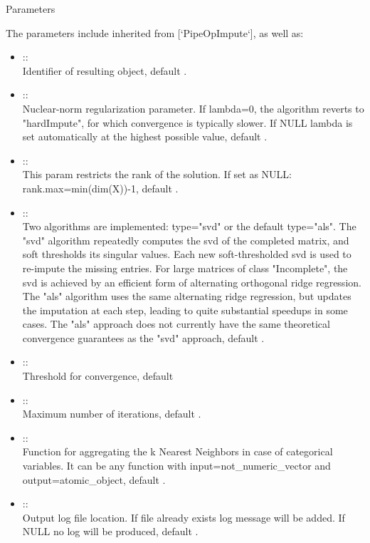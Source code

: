 \documentclass[letterpaper]{book}
\begin{document}
\begin{Section}{Parameters}

The parameters include inherited from [`PipeOpImpute`], as well as: \\{}
\begin{itemize}

\item{}  :: \\{}
Identifier of resulting object, default .
\item{}  :: \\{}
Nuclear-norm regularization parameter. If lambda=0, the algorithm reverts to "hardImpute", for which convergence is typically slower. If NULL lambda is set automatically at the highest possible value, default .
\item{}  :: \\{}
This param restricts the rank of the solution. If set as NULL: rank.max=min(dim(X))-1, default .
\item{}  :: \\{}
Two algorithms are implemented: type="svd" or the default type="als". The "svd" algorithm repeatedly computes the svd of the completed matrix, and soft thresholds its singular values. Each new soft-thresholded svd is used to re-impute the missing entries. For large matrices of class "Incomplete", the svd is achieved by an efficient form of alternating orthogonal ridge regression. The "als" algorithm uses the same alternating ridge regression, but updates the imputation at each step, leading to quite substantial speedups in some cases. The "als" approach does not currently have the same theoretical convergence guarantees as the "svd" approach, default .
\item{}  :: \\{}
Threshold for convergence, default 
\item{}  :: \\{}
Maximum number of iterations, default .
\item{}  :: \\{}
Function for aggregating the k Nearest Neighbors in case of categorical variables. It can be any function with input=not\_numeric\_vector and output=atomic\_object, default .
\item{}  :: \\{}
Output log file location. If file already exists log message will be added. If NULL no log will be produced, default .

\end{itemize}

\end{Section}
\end{document}
